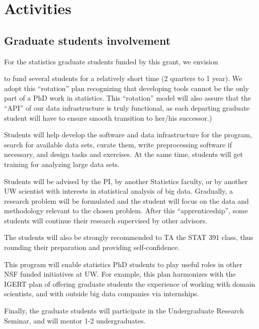 \section{Activities}
\label{sec:activities}

\subsection{Graduate students involvement}
\label{sec:activities-grad}

For the statistics graduate students funded by this grant, we envision 
\bits
\item to fund several students for a relatively short time (2 quarters
  to 1 year). We adopt this ``rotation'' plan recognizing that developing 
tools cannot be the only part of a PhD work in statistics. 
This ``rotation'' model will also assure that the ``API'' of our data
infrastructure is truly functional, as each departing graduate student 
will have to ensure smooth transition to her/his successor.)
\item Students will help develop the software and data infrastructure for
  the program, search for available data sets, curate them, write
  preprocessing software if necessary, and design tasks and exercises. 
  At the same time, students will get training for analyzing large data sets. 
\item Students will be advised by the PI, by another Statistics faculty, or by another UW scientist with interests in statistical analysis of big data. Gradually, a research problem will be formulated and the student will
focus on the data and methodology relevant to the chosen problem. After this ``apprenticeship'', 
some students will continue their research supervised by other advisors. 
\item The students will also be strongly recommended to TA the STAT 391 class, thus rounding their preparation and providing self-confidence. 
\item This program will enable statistics PhD students to play useful roles in other NSF funded initiatives at UW. For 
example, this plan harmonizes with the IGERT plan of offering graduate students the experience of working with domain scientists, and with outside big data companies via internships. 
\item Finally, the graduate students will participate in the Undergraduate Research Seminar, and will mentor 1-2 undergraduates. 
 \eits


